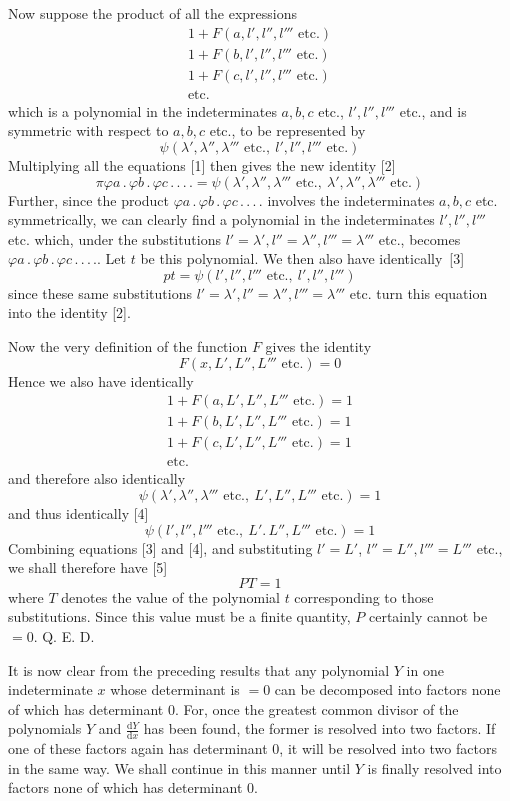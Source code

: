 Now suppose the product of all the expressions
\[
\begin{gathered}
1+F(a,l',l'',l'''\text{ etc.})\\
1+F(b,l',l'',l'''\text{ etc.})\\
1+F(c,l',l'',l'''\text{ etc.})\\
\text{etc.}
\end{gathered}
\]
which is a polynomial in the indeterminates $a,b,c$ etc., $l',l'',l'''$ etc., and is symmetric with respect to $a,b,c$ etc., to be represented by
\[
\psi(\lambda',\lambda'',\lambda'''\text{ etc.},\ l',l'',l'''\text{ etc.})
\]
Multiplying all the equations [1] then gives the new identity [2]
\[
\pi\varphi a\, .\,\varphi b\, .\,\varphi c\, .\, .\, .\, .=\psi(\lambda',\lambda'',\lambda'''\text{ etc.},\ \lambda',\lambda'',\lambda'''\text{ etc.})
\]
Further, since the product $\varphi a\, .\,\varphi b\, .\,\varphi c\, .\, .\, .\, .$ involves the indeterminates $a,b,c$ etc. symmetrically, we can clearly find a polynomial in the indeterminates $l',l'',l'''$ etc. which, under the substitutions $l'=\lambda',l''=\lambda'',l'''=\lambda'''$ etc., becomes $\varphi a\, .\,\varphi b\, .\,\varphi c\, .\, .\, .\, .$. Let $t$ be this polynomial. We then also have \mbox{identically [3]}
\[
pt=\psi(l',l'',l'''\text{ etc.},\ l',l'',l''')
\]
since these same substitutions $l'=\lambda',l''=\lambda'',l'''=\lambda'''$ etc. turn this equation into the identity [2].

Now the very definition of the function $F$ gives the identity
\[
F(x,L',L'',L'''\text{ etc.})=0
\]
Hence we also have identically
\[
\begin{gathered}
1+F(a,L',L'',L'''\text{ etc.})=1\\
1+F(b,L',L'',L'''\text{ etc.})=1\\
1+F(c,L',L'',L'''\text{ etc.})=1\\
\text{etc.}
\end{gathered}
\]
and therefore also identically
\[
\psi(\lambda',\lambda'',\lambda'''\text{ etc.},\ L',L'',L'''\text{ etc.})=1
\]
and thus identically [4]
\[
\psi(l',l'',l'''\text{ etc.},\ L'.\,L'',L'''\text{ etc.})=1
\]
Combining equations [3] and [4], and substituting $l'=L'$, $l''=L'',l'''=L'''$ etc., we shall therefore have [5]
\[
PT=1
\]
where $T$ denotes the value of the polynomial $t$ corresponding to those substitutions. Since this value must be a finite quantity, $P$ certainly cannot be $=0$. Q. E. D.

It is now clear from the preceding results that any polynomial $Y$ in one indeterminate $x$ whose determinant is $=0$ can be decomposed into factors none of which has determinant 0. For, once the greatest common divisor of the polynomials $Y$ and $\frac{\mathrm dY}{\mathrm dx}$ has been found, the former is resolved into two factors. If one of these factors again has determinant 0, it will be resolved into two factors in the same way. We shall continue in this manner until $Y$ is finally resolved into factors none of which has determinant 0.

